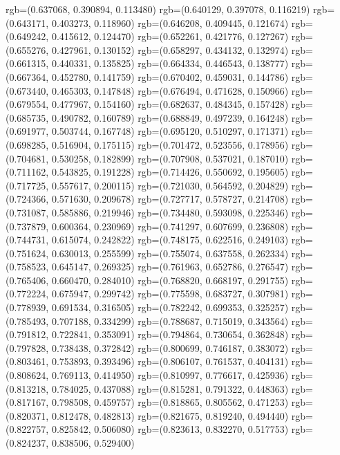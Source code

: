 {{{					rgb=(0.637068, 0.390894, 0.113480)
					rgb=(0.640129, 0.397078, 0.116219)
					rgb=(0.643171, 0.403273, 0.118960)
					rgb=(0.646208, 0.409445, 0.121674)
					rgb=(0.649242, 0.415612, 0.124470)
					rgb=(0.652261, 0.421776, 0.127267)
					rgb=(0.655276, 0.427961, 0.130152)
					rgb=(0.658297, 0.434132, 0.132974)
					rgb=(0.661315, 0.440331, 0.135825)
					rgb=(0.664334, 0.446543, 0.138777)
					rgb=(0.667364, 0.452780, 0.141759)
					rgb=(0.670402, 0.459031, 0.144786)
					rgb=(0.673440, 0.465303, 0.147848)
					rgb=(0.676494, 0.471628, 0.150966)
					rgb=(0.679554, 0.477967, 0.154160)
					rgb=(0.682637, 0.484345, 0.157428)
					rgb=(0.685735, 0.490782, 0.160789)
					rgb=(0.688849, 0.497239, 0.164248)
					rgb=(0.691977, 0.503744, 0.167748)
					rgb=(0.695120, 0.510297, 0.171371)
					rgb=(0.698285, 0.516904, 0.175115)
					rgb=(0.701472, 0.523556, 0.178956)
					rgb=(0.704681, 0.530258, 0.182899)
					rgb=(0.707908, 0.537021, 0.187010)
					rgb=(0.711162, 0.543825, 0.191228)
					rgb=(0.714426, 0.550692, 0.195605)
					rgb=(0.717725, 0.557617, 0.200115)
					rgb=(0.721030, 0.564592, 0.204829)
					rgb=(0.724366, 0.571630, 0.209678)
					rgb=(0.727717, 0.578727, 0.214708)
					rgb=(0.731087, 0.585886, 0.219946)
					rgb=(0.734480, 0.593098, 0.225346)
					rgb=(0.737879, 0.600364, 0.230969)
					rgb=(0.741297, 0.607699, 0.236808)
					rgb=(0.744731, 0.615074, 0.242822)
					rgb=(0.748175, 0.622516, 0.249103)
					rgb=(0.751624, 0.630013, 0.255599)
					rgb=(0.755074, 0.637558, 0.262334)
					rgb=(0.758523, 0.645147, 0.269325)
					rgb=(0.761963, 0.652786, 0.276547)
					rgb=(0.765406, 0.660470, 0.284010)
					rgb=(0.768820, 0.668197, 0.291755)
					rgb=(0.772224, 0.675947, 0.299742)
					rgb=(0.775598, 0.683727, 0.307981)
					rgb=(0.778939, 0.691534, 0.316505)
					rgb=(0.782242, 0.699353, 0.325257)
					rgb=(0.785493, 0.707188, 0.334299)
					rgb=(0.788687, 0.715019, 0.343564)
					rgb=(0.791812, 0.722841, 0.353091)
					rgb=(0.794864, 0.730654, 0.362848)
					rgb=(0.797828, 0.738438, 0.372842)
					rgb=(0.800699, 0.746187, 0.383072)
					rgb=(0.803461, 0.753893, 0.393496)
					rgb=(0.806107, 0.761537, 0.404131)
					rgb=(0.808624, 0.769113, 0.414950)
					rgb=(0.810997, 0.776617, 0.425936)
					rgb=(0.813218, 0.784025, 0.437088)
					rgb=(0.815281, 0.791322, 0.448363)
					rgb=(0.817167, 0.798508, 0.459757)
					rgb=(0.818865, 0.805562, 0.471253)
					rgb=(0.820371, 0.812478, 0.482813)
					rgb=(0.821675, 0.819240, 0.494440)
					rgb=(0.822757, 0.825842, 0.506080)
					rgb=(0.823613, 0.832270, 0.517753)
					rgb=(0.824237, 0.838506, 0.529400)
}}}
